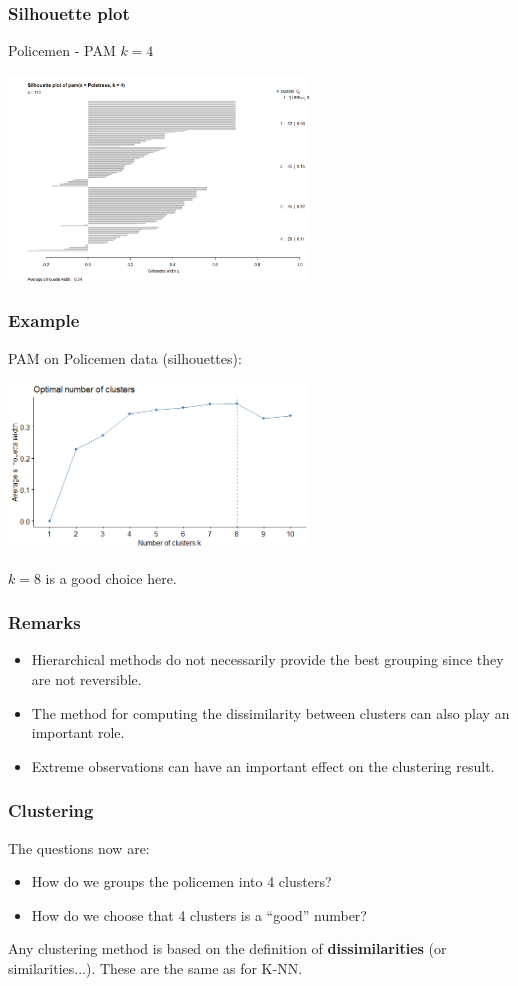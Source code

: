 \begin{frame}
\frametitle{Silhouette plot}
Policemen - PAM $k=4$ 
\begin{center}
\includegraphics[width=8cm]{../../Graphs/Polstress-silhou.png}
\end{center}
\end{frame}
\begin{frame}
\frametitle{Example}
PAM on Policemen data (silhouettes):
\begin{center}
\includegraphics[width=8cm]{../../Graphs/Nb_pam_sil.png}
\end{center}
$k=8$ is a good choice here.
\end{frame}
\begin{frame}
\frametitle{Remarks}
\begin{itemize}
\item Hierarchical methods do not necessarily provide the best grouping since they are not reversible.
\item The method for computing the dissimilarity between clusters can also play an important role.
\item Extreme observations can have an important effect on the clustering result.
\end{itemize}
\end{frame}
\begin{frame}
\frametitle{Clustering}
The questions now are:
\begin{itemize}
\item How do we groups the policemen into 4 clusters?
\item How do we choose that 4 clusters is a ``good'' number?
\end{itemize}
Any clustering method is based on the definition of {\bf dissimilarities} (or similarities...). These are the same as for K-NN.
\end{frame}


